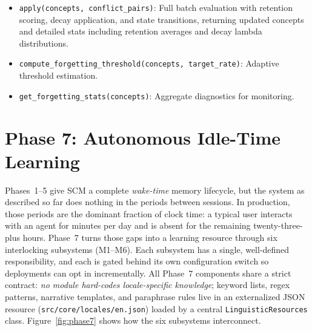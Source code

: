 \documentclass[11pt,twocolumn]{article}
\begin{document}
\begin{itemize}
\item \texttt{apply(concepts, conflict\_pairs)}: Full batch evaluation with retention scoring, decay application, and state transitions, returning updated concepts and detailed stats including retention averages and decay lambda distributions.
\item \texttt{compute\_forgetting\_threshold(concepts, target\_rate)}: Adaptive threshold estimation.
\item \texttt{get\_forgetting\_stats(concepts)}: Aggregate diagnostics for monitoring.
\end{itemize}

\section{Phase 7: Autonomous Idle-Time Learning}
\label{sec:phase7}

Phases~1--5 give SCM a complete \emph{wake-time} memory lifecycle, but the system as described so far does nothing in the periods between sessions. In production, those periods are the dominant fraction of clock time: a typical user interacts with an agent for minutes per day and is absent for the remaining twenty-three-plus hours. Phase~7 turns those gaps into a learning resource through six interlocking subsystems (M1--M6). Each subsystem has a single, well-defined responsibility, and each is gated behind its own configuration switch so deployments can opt in incrementally. All Phase~7 components share a strict contract: \emph{no module hard-codes locale-specific knowledge}; keyword lists, regex patterns, narrative templates, and paraphrase rules live in an externalized JSON resource (\texttt{src/core/locales/en.json}) loaded by a central \texttt{LinguisticResources} class. Figure~\ref{fig:phase7} shows how the six subsystems interconnect.
\end{document}
